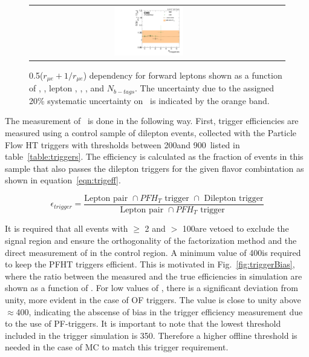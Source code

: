 \begin{figure}[htbp]
\begin{center}
\begin{tabular}{ccc}
      \includegraphics[width=0.30\textwidth]{bkgd/figs/rSFOFFromRMuE_ZPeakControlForward_Run2015_25ns_NBJets_None.pdf} \\
    \end{tabular}
  \end{center}
  \caption{
    \label{fig:RDependencyForward}
    0.5($r_{\mu e}+1/r_{\mu e}$) dependency for forward leptons shown as a function of \nj, \nvtx, lepton \pt, \mll, \MET, and $N_{b-tags}$.
    The uncertainty due to the assigned 20\% systematic uncertainty on \rmue~is indicated by the orange band.
  }
\end{figure}

The measurement of \rt\ is done in the following way.
First, trigger efficiencies are measured using a control sample of dilepton events,
collected with the Particle Flow HT triggers with thresholds between 200\GeV and 900\GeV\ listed in table~\ref{table:triggers}.
The efficiency is calculated as the fraction of events in this sample that also passes the dilepton triggers for the given flavor combintation as shown in equation~\ref{eqn:trigeff}.

\begin{equation}
\label{eqn:trigeff}
  \epsilon_{trigger} =\frac{\text{Lepton pair }\cap PFH_T \text{ trigger } \cap\text{ Dilepton trigger}  }{\text{Lepton pair }\cap PFH_T \text{ trigger }}
\end{equation} 

It is required that all events with \nj $\geq$ 2 and \MET $>$ 100\GeV are vetoed to exclude the signal region
and ensure the orthogonality of the factorization method and the direct measurement of \rsfof in the control region.
A minimum \HT value of 400\GeV is required to keep the PFHT triggers efficient.
This is motivated in Fig.~\ref{fig:triggerBias},
where the ratio between the measured and the true efficiencies in \ttbar simulation are shown as a function of \HT.
For low values of \HT, there is a significant deviation from unity,
more evident in the case of OF triggers.
The value is close to unity above $\approx$400\GeV,
indicating the abscense of bias in the trigger efficiency measurement due to the use of PF-\HT triggers.
It is important to note that the lowest \HT threshold included in the trigger simulation is 350\GeV.
Therefore a higher offline \HT threshold is needed in the case of MC to match this trigger requirement. 

